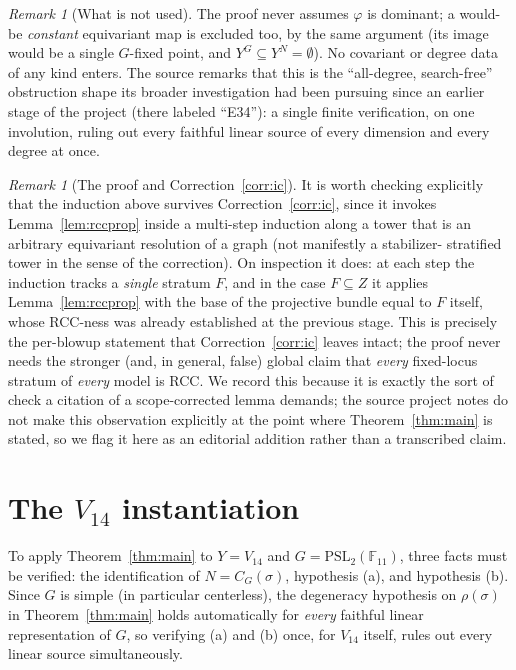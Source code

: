 \documentclass[11pt]{article}
\theoremstyle{plain}
\theoremstyle{definition}
\theoremstyle{remark}
\newtheorem{remark}[theorem]{Remark}
\newcommand{\PSL}{\mathrm{PSL}_2(\mathbb{F}_{11})}
\begin{document}
\begin{remark}[What is not used]
The proof never assumes $\varphi$ is dominant; a would-be
\emph{constant} equivariant map is excluded too, by the same argument
(its image would be a single $G$-fixed point, and $Y^G\subseteq Y^N=
\emptyset$). No covariant or degree data of any kind enters. The source
remarks that this is the ``all-degree, search-free'' obstruction shape
its broader investigation had been pursuing since an earlier stage of
the project (there labeled ``E34''): a single finite verification, on
one involution, ruling out every faithful linear source of every
dimension and every degree at once.
\end{remark}

\begin{remark}[The proof and Correction~\ref{corr:ic}]
\label{rem:correction-check}
It is worth checking explicitly that the induction above survives
Correction~\ref{corr:ic}, since it invokes Lemma~\ref{lem:rccprop}
inside a multi-step induction along a tower that is an arbitrary
equivariant resolution of a graph (not manifestly a stabilizer-
stratified tower in the sense of the correction). On inspection it
does: at each step the induction tracks a \emph{single} stratum $F$,
and in the case $F\subseteq Z$ it applies Lemma~\ref{lem:rccprop} with
the base of the projective bundle equal to $F$ itself, whose RCC-ness
was already established at the previous stage. This is precisely the
per-blowup statement that Correction~\ref{corr:ic} leaves intact; the
proof never needs the stronger (and, in general, false) global claim
that \emph{every} fixed-locus stratum of \emph{every} model is RCC. We
record this because it is exactly the sort of check a citation of a
scope-corrected lemma demands; the source project notes do not make
this observation explicitly at the point where Theorem~\ref{thm:main}
is stated, so we flag it here as an editorial addition rather than a
transcribed claim.
\end{remark}

\section{The \texorpdfstring{$V_{14}$}{V14} instantiation}
\label{sec:v14}

To apply Theorem~\ref{thm:main} to $Y=V_{14}$ and $G=\PSL$, three facts
must be verified: the identification of $N=C_G(\sigma)$, hypothesis (a),
and hypothesis (b). Since $G$ is simple (in particular centerless), the
degeneracy hypothesis on $\rho(\sigma)$ in Theorem~\ref{thm:main} holds
automatically for \emph{every} faithful linear representation of $G$,
so verifying (a) and (b) once, for $V_{14}$ itself, rules out every
linear source simultaneously.
\end{document}
